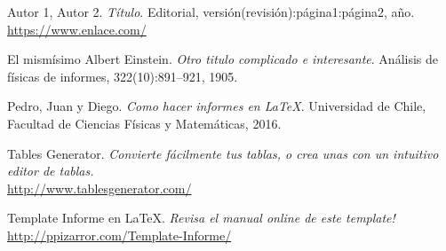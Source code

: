 \newpage
\begin{thebibliography}{99}
	
		 Autor 1, Autor 2.
		\textit{Título}.
		Editorial, versión(revisión):página1:página2, año.
		\\\url{https://www.enlace.com/}
		
		 El mismísimo Albert Einstein. 
		\textit{Otro titulo complicado e interesante}. 
		Análisis de físicas de informes, 322(10):891–921, 1905.
	
		 Pedro, Juan y Diego. 
		\textit{Como hacer informes en \LaTeX}. 
		Universidad de Chile, Facultad de Ciencias Físicas y Matemáticas, 2016.
	
		 Tables Generator.
		\textit{Convierte fácilmente tus tablas, o crea unas con un intuitivo editor de tablas.}
		\\\url{http://www.tablesgenerator.com/}
		
		 Template Informe en \LaTeX.
		\textit{Revisa el manual online de este template!}
		\\\url{http://ppizarror.com/Template-Informe/}
	
\end{thebibliography}